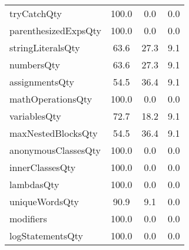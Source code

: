 \begin{tabular}{lccc}
tryCatchQty & 100.0 & 0.0 & 0.0 \\
parenthesizedExpsQty & 100.0 & 0.0 & 0.0 \\
stringLiteralsQty & 63.6 & 27.3 & 9.1 \\
numbersQty & 63.6 & 27.3 & 9.1 \\
assignmentsQty & 54.5 & 36.4 & 9.1 \\
mathOperationsQty & 100.0 & 0.0 & 0.0 \\
variablesQty & 72.7 & 18.2 & 9.1 \\
maxNestedBlocksQty & 54.5 & 36.4 & 9.1 \\
anonymousClassesQty & 100.0 & 0.0 & 0.0 \\
innerClassesQty & 100.0 & 0.0 & 0.0 \\
lambdasQty & 100.0 & 0.0 & 0.0 \\
uniqueWordsQty & 90.9 & 9.1 & 0.0 \\
modifiers & 100.0 & 0.0 & 0.0 \\
logStatementsQty & 100.0 & 0.0 & 0.0 \\
\bottomrule
              \end{tabular}
            